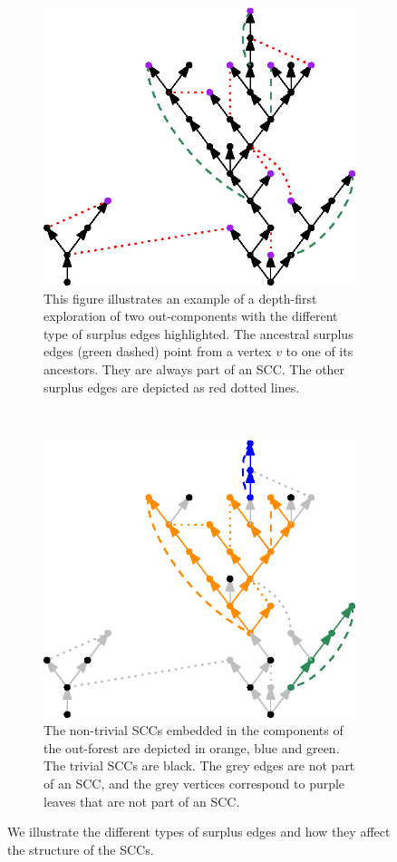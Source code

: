\begin{figure}
\centering
\begin{subfigure}{0.7\textwidth}
 \centering
    \includegraphics[width=0.7\linewidth]{Content/Pictures/types_of_surplus_edges.eps}
    \caption{This figure illustrates an example of a depth-first exploration of two out-components with the different type of surplus edges highlighted. The ancestral surplus edges (green dashed) point from a vertex $v$ to one of its ancestors. They are always part of an SCC. The other surplus edges are depicted as red dotted lines.}
    \label{subfigure.typesofsurplusedges} 
\end{subfigure}\\
\begin{subfigure}{0.7\textwidth}
  \centering
  \includegraphics[width=0.7\linewidth]{Content/Pictures/sccs_in_example.eps}
  \caption{The non-trivial SCCs embedded in the components of the out-forest are depicted in orange, blue and green. The trivial SCCs are black. The grey edges are not part of an SCC, and the grey vertices correspond to purple leaves that are not part of an SCC.}
    \label{subfigure.sccinexample}
\end{subfigure}
\caption{We illustrate the different types of surplus edges and how they affect the structure of the SCCs.}
\end{figure}

